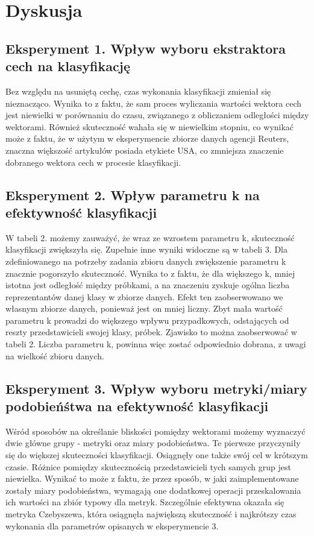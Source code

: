 \documentclass{classrep}
\begin{document}
\newpage
\section{Dyskusja}
\subsection{Eksperyment 1. Wpływ wyboru ekstraktora cech na klasyfikację}
Bez względu na usuniętą cechę, czas wykonania klasyfikacji zmieniał się nieznacząco. Wynika to z faktu, że sam proces wyliczania wartości wektora cech jest niewielki w porównaniu do czasu, związanego z obliczaniem odległości między wektorami. Również skuteczność wahała się w niewielkim stopniu, co wynikać może z faktu, że w użytym w eksperymencie zbiorze danych agencji Reuters, znaczna większość artykułów posiada etykiete USA, co zmniejsza znaczenie dobranego wektora cech w procesie klasyfikacji.
\subsection{Eksperyment 2. Wpływ parametru k na efektywność klasyfikacji}
W tabeli 2. możemy zauważyć, że wraz ze wzrostem parametru k, skuteczność klasyfikacji zwiększyła się. Zupełnie inne wyniki widoczne są w tabeli 3. Dla zdefiniowanego na potrzeby zadania zbioru danych zwiększenie parametru k znacznie pogorszyło skuteczność. Wynika to z faktu, że dla większego k, mniej istotna jest odległość między próbkami, a na znaczeniu zyskuje ogólna liczba reprezentantów danej klasy w zbiorze danych. Efekt ten zaobserwowano we własnym zbiorze danych, ponieważ jest on mniej liczny. Zbyt mała wartość parametru k prowadzi do większego wpływu przypadkowych, odstających od reszty przedstawicieli swojej klasy, próbek. Zjawisko to można zaobserwować w tabeli 2. Liczba parametru k, powinna więc zostać odpowiednio dobrana, z uwagi na wielkość zbioru danych.
\subsection{Eksperyment 3. Wpływ wyboru metryki/miary podobieńśtwa na efektywność klasyfikacji}
Wśród sposobów na określanie bliskości pomiędzy wektorami możemy wyznaczyć dwie główne grupy - metryki oraz miary podobieństwa. Te pierwsze przyczyniły się do większej skuteczności klasyfikacji. Osiągnęły one także swój cel w krótszym czasie. Różnice pomiędzy skutecznością przedstawicieli tych samych grup jest niewielka. Wynikać to może z faktu, że przez sposób, w jaki zaimplementowane zostały miary podobieństwa, wymagają one dodatkowej operacji przeskalowania ich wartości na zbiór typowy dla metryk. Szczególnie efektywna okazała się metryka Czebyszewa, która osiągnęła największą skuteczność i najkrótszy czas wykonania dla parametrów opisanych w eksperymencie 3. 
\end{document}
